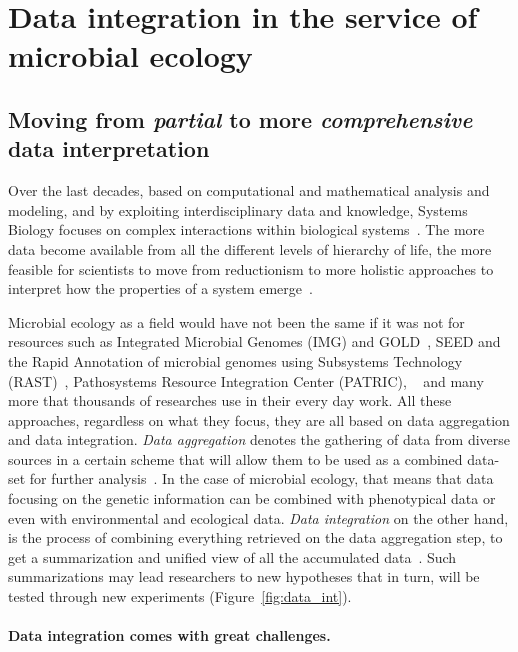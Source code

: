\section{Data integration in the service of microbial ecology}

   \subsection{Moving from \textit{partial} to more \textit{comprehensive} data interpretation}
   \label{subsec:integration_intro}
      Over the last decades, based on
      computational and mathematical analysis and modeling,
      and by exploiting interdisciplinary data and knowledge, 
      Systems Biology focuses on complex interactions within biological systems~\citep{tavassoly2018systems}.
      The more data become available from all the different levels
      of hierarchy of life, the more feasible for scientists to 
      move from reductionism to more holistic approaches 
      to interpret how the properties of a system emerge~\citep{noble2008music}.

      Microbial ecology as a field would have not been the same if it was not 
      for resources such as 
      Integrated Microbial Genomes (IMG) and GOLD~\citep{chen2021img}, 
      SEED and the Rapid Annotation of microbial genomes using Subsystems Technology (RAST)~\citep{overbeek2014seed}, 
      Pathosystems Resource Integration Center (PATRIC),
      ~\citep{zhulin2015databases}
      and many more that thousands of researches use in their every day work. 
      All these approaches, regardless on what they focus, they are all based on data aggregation and data integration. 
      \textit{Data aggregation} denotes the gathering of data from diverse sources
      in a certain scheme that will allow them to be used as a combined data-set for 
      further analysis~\citep{simpson2010secure}. 
      In the case of microbial ecology, that means that data focusing on the genetic 
      information can be combined with phenotypical data or even with environmental and 
      ecological data.
      \textit{Data integration} on the other hand, is the process of combining everything
      retrieved on the data aggregation step, 
      to get a summarization and unified view of all the accumulated data~\citep{schneider2012teaching}.
      Such summarizations may lead researchers to new hypotheses that 
      in turn, will be tested through new experiments (Figure~\ref{fig:data_int}).


      \paragraph{Data integration comes with great challenges.}


